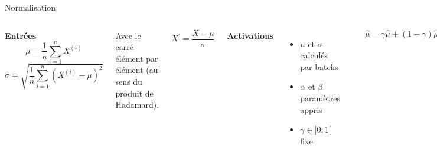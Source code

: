 \documentclass[10pt,xcolor={x11names}]{beamer}
\newcommand{\sectitle}[1]{{\large\color{titleblue}\textbf{#1}\\\smallskip}}
\begin{document}
\begin{frame}{Normalisation}
	\begin{columns}[T]
		\sectitle{Entrées}
		$$
		\mu=\frac{1}{n}\sum_{i=1}^nX^{(i)}
		$$
		$$
		\sigma=\sqrt{\frac{1}{n}\sum_{i=1}^n(X^{(i)}-\mu)^2}
		$$
		
		Avec le carré élément par élément (au sens du produit de Hadamard).
		
		$$
		X^\prime=\frac{X-\mu}{\sigma}
		$$
		
		\sectitle{Activations}
		
		\begin{itemize}
			\item $\mu$ et $\sigma$ calculés par batchs
			\item $\alpha$ et $\beta$ paramètres appris
			\item $\gamma\in]0;1[$ fixe
		\end{itemize}
	
		{\centering\includegraphics[width=0.8\textwidth]{gaussian.png}}
		
		
		$$
		\hat{\mu}=\gamma\hat{\mu}+(1-\gamma)\hat{\mu}
		\ \ \ \ \ \ \text{et} \ \ \ \ \ \ \hat{\sigma}=\gamma\hat{\sigma}+(1-\gamma)\hat{\sigma}
		$$
		
		$$
		a_{\text{norm}}=\alpha\frac{a-\hat{\mu}}{\hat{\sigma}}+\beta
		$$
	\end{columns}
\end{frame}
\end{document}
